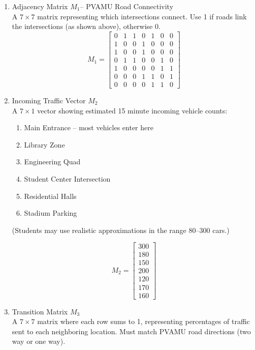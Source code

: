 \documentclass{ximera}
\begin{document}
\begin{enumerate}
    \item Adjacency Matrix $M_1$– PVAMU Road Connectivity\\
    A $7\times 7$ matrix representing which intersections connect. Use 1 if roads link the intersections (as shown above), otherwise 0.\\

    \[
M_1=
\begin{bmatrix}
0 & 1 & 1 & 0 & 1 & 0 & 0 \\
1 & 0 & 0 & 1 & 0 & 0 & 0 \\
1 & 0 & 0 & 1 & 0 & 0 & 0 \\
0 & 1 & 1 & 0 & 0 & 1 & 0 \\
1 & 0 & 0 & 0 & 0 & 1 & 1 \\
0 & 0 & 0 & 1 & 1 & 0 & 1 \\
0 & 0 & 0 & 0 & 1 & 1 & 0
\end{bmatrix}
\]

    \item Incoming Traffic Vector $M_2$\\
    A $7\times 1$ vector showing estimated 15 minute incoming vehicle counts:
    \begin{enumerate}    
    \item[A:] Main Entrance – most vehicles enter here
    \item[B:] Library Zone
    \item[C:] Engineering Quad
    \item[D:] Student Center Intersection
    \item[E:] Residential Halls
    \item[F:] Stadium Parking
\end{enumerate}
(Students may use realistic approximations in the range 80–300 cars.)

\[
M_2=
\begin{bmatrix}
300 \\
180 \\
150 \\
200 \\
120 \\
170 \\
160
\end{bmatrix}
\]


    \item Transition Matrix $M_3$\\
    A $7\times 7$ matrix where each row sums to 1, representing percentages of traffic sent to each neighboring location. Must match PVAMU road directions (two way or one way).\\


\end{enumerate}
\end{document}
